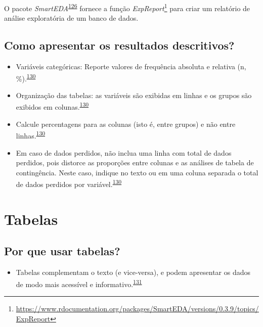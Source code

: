 \documentclass[
  a4paper,
]{book}
\providecommand{\tightlist}{%
  \setlength{\itemsep}{0pt}\setlength{\parskip}{0pt}}
\renewcommand{\href}[2]{#2\footnote{\url{#1}}}
\newenvironment{infobox}[1]
  {
  \begin{itemize}
  \renewcommand{\labelitemi}{
    \raisebox{-.7\height}[0pt][0pt]{
      {\setkeys{Gin}{width=3em,keepaspectratio}
        \texttt{[image: \#1]}}
    }
  }
  \setlength{\fboxsep}{1em}
  \begin{blackbox}
  \item
  }
  {
  \end{blackbox}
  \end{itemize}
  }
\begin{document}
\begin{infobox}{images/Rlogo}
O pacote \emph{SmartEDA}\textsuperscript{\protect\hyperlink{ref-SmartEDA}{126}} fornece a função \href{https://www.rdocumentation.org/packages/SmartEDA/versions/0.3.9/topics/ExpReport}{\emph{ExpReport}} para criar um relatório de análise exploratória de um banco de dados.

\end{infobox}

\hypertarget{como-apresentar-os-resultados-descritivos}{%
\subsection{Como apresentar os resultados descritivos?}\label{como-apresentar-os-resultados-descritivos}}

\begin{itemize}
\item
  Variáveis categóricas: Reporte valores de frequência absoluta e relativa (n, \%).\textsuperscript{\protect\hyperlink{ref-Cummings2003}{130}}
\item
  Organização das tabelas: as variáveis são exibidas em linhas e os grupos são exibidos em colunas.\textsuperscript{\protect\hyperlink{ref-Cummings2003}{130}}
\item
  Calcule percentagens para as colunas (isto é, entre grupos) e não entre linhas.\textsuperscript{\protect\hyperlink{ref-Cummings2003}{130}}
\item
  Em caso de dados perdidos, não inclua uma linha com total de dados perdidos, pois distorce as proporções entre colunas e as análises de tabela de contingência. Neste caso, indique no texto ou em uma coluna separada o total de dados perdidos por variável.\textsuperscript{\protect\hyperlink{ref-Cummings2003}{130}}
\end{itemize}

\hypertarget{tabelas}{%
\section{Tabelas}\label{tabelas}}

\hypertarget{por-que-usar-tabelas}{%
\subsection{Por que usar tabelas?}\label{por-que-usar-tabelas}}

\begin{itemize}
\tightlist
\item
  Tabelas complementam o texto (e vice-versa), e podem apresentar os dados de modo mais acessível e informativo.\textsuperscript{\protect\hyperlink{ref-Inskip2017}{131}}
\end{itemize}
\end{document}
